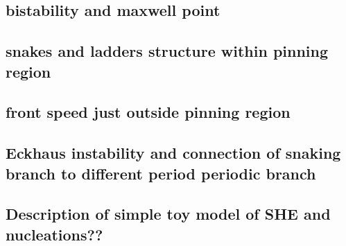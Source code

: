 \documentclass[../main/TimeForcingSHE.tex]{subfiles}
\begin{document}
\subsection{bistability and maxwell point}
\subsection{snakes and ladders structure within pinning region}
\subsection{front speed just outside pinning region}
\subsection{Eckhaus instability and connection of snaking branch to different period periodic branch}
\subsection{Description of simple toy model of SHE and nucleations??}
\end{document}
